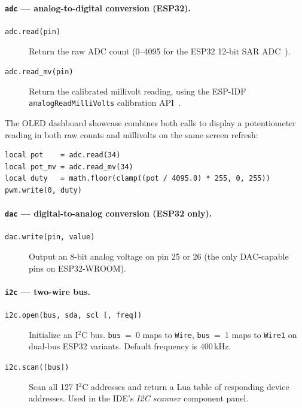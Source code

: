 \paragraph{\texttt{adc} --- analog-to-digital conversion (ESP32).}
\begin{description}
  \item[\texttt{adc.read(pin)}] Return the raw ADC count (0--4095 for the ESP32 12-bit SAR ADC~\cite{ESP32TRM}).
  \item[\texttt{adc.read\_mv(pin)}] Return the calibrated millivolt reading, using the ESP-IDF \texttt{analogReadMilliVolts} calibration API~\cite{ESP32TRM}.
\end{description}

The OLED dashboard showcase combines both calls to display a potentiometer reading in both raw counts and millivolts on the same screen refresh:

\begin{lstlisting}[language={}]
local pot    = adc.read(34)
local pot_mv = adc.read_mv(34)
local duty   = math.floor(clamp((pot / 4095.0) * 255, 0, 255))
pwm.write(0, duty)
\end{lstlisting}

\paragraph{\texttt{dac} --- digital-to-analog conversion (ESP32 only).}
\begin{description}
  \item[\texttt{dac.write(pin, value)}] Output an 8-bit analog voltage on pin 25 or 26 (the only DAC-capable pins on ESP32-WROOM).
\end{description}

\paragraph{\texttt{i2c} --- two-wire bus.}
\begin{description}
  \item[\texttt{i2c.open(bus, sda, scl [, freq])}] Initialize an I$^2$C bus. \texttt{bus}~=~0 maps to \texttt{Wire}, \texttt{bus}~=~1 maps to \texttt{Wire1} on dual-bus ESP32 variants. Default frequency is 400\,kHz.
  \item[\texttt{i2c.scan([bus])}] Scan all 127 I$^2$C addresses and return a Lua table of responding device addresses. Used in the IDE's \textit{I2C scanner} component panel.
\end{description}

